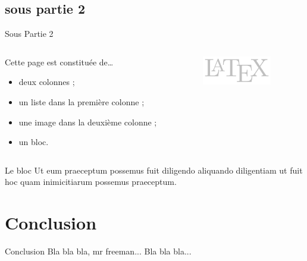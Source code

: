 \documentclass[utf8,compress]{beamer}
\begin{document}
\subsection{sous partie 2}
\begin{frame}{Sous Partie 2}
    \begin{columns}
        \begin{column}{0.7\textwidth}
            Cette page est constituée de\dots
            \begin{itemize}
                \item deux colonnes ;
                \item un liste dans la première colonne ;
                \item une image dans la deuxième colonne ;
                \item un bloc.
            \end{itemize}
        \end{column}
        \begin{column}{0.3\textwidth}
            \begin{figure}[h]
                \includegraphics[width=3cm]{image.png}
            \end{figure}
        \end{column}
    \end{columns}

    \vspace{1em}

    \begin{block}{Le bloc}
        Ut eum praeceptum possemus fuit diligendo aliquando diligentiam ut fuit hoc quam inimicitiarum possemus praeceptum.
    \end{block}
\end{frame}




\section{Conclusion}
\begin{frame}{Conclusion}
    Bla bla bla, mr freeman... Bla bla bla...
\end{frame}


\end{document}
